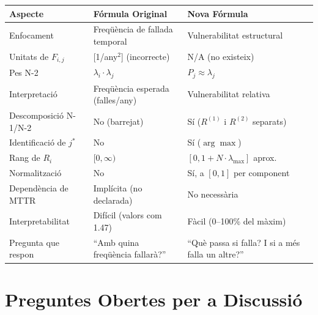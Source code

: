 \documentclass[11pt,a4paper]{article}
\begin{document}
\begin{table}[htbp]
\centering
\renewcommand{\arraystretch}{1.3}
\begin{tabular}{p{4cm} p{4.5cm} p{4.5cm}}
\toprule
\textbf{Aspecte} & \textbf{Fórmula Original} & \textbf{Nova Fórmula} \\
\midrule
Enfocament & Freqüència de fallada temporal & Vulnerabilitat estructural \\
Unitats de $F_{i,j}$ & [1/any$^2$] (incorrecte) & N/A (no existeix) \\
Pes N-2 & $\lambda_i \cdot \lambda_j$ & $P_j \approx \lambda_j$ \\
Interpretació & Freqüència esperada (falles/any) & Vulnerabilitat relativa \\
Descomposició N-1/N-2 & No (barrejat) & Sí ($R^{(1)}$ i $R^{(2)}$ separats) \\
Identificació de $j^*$ & No & Sí ($\arg\max$) \\
Rang de $R_i$ & $[0, \infty)$ & $[0, 1 + N \cdot \lambda_{\max}]$ aprox. \\
Normalització & No & Sí, a $[0,1]$ per component \\
Dependència de MTTR & Implícita (no declarada) & No necessària \\
Interpretabilitat & Difícil (valors com 1.47) & Fàcil (0--100\% del màxim) \\
Pregunta que respon & ``Amb quina freqüència fallarà?'' & ``Què passa si falla? I si a més falla un altre?'' \\
\bottomrule
\end{tabular}
\end{table}

\section{Preguntes Obertes per a Discussió}
\end{document}
